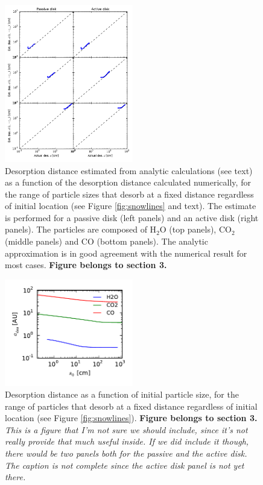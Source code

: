 \documentclass[apj]{emulateapj}
\newcommand{\emgr}[1]{\emph{ \color{gray} #1}}
\begin{document}
\begin{figure}[h!]
\centering
\includegraphics[width=0.5\textwidth]{../../figs/desorption_distance_actual_vs_estimated_passive_active.pdf}
\caption{Desorption distance estimated from analytic calculations (see text) as a function of the desorption distance calculated numerically, for the range of particle sizes that desorb at a fixed distance regardless of initial location (see Figure \ref{fig:snowlines} and text). The estimate is performed for a passive disk (left panels) and an active disk (right panels).  The particles are composed of H$_2$O (top panels), CO$_2$ (middle panels) and CO (bottom panels). The analytic approximation is in good agreement with the numerical result for most cases. \textbf{Figure belongs to section 3.}}  %
\label{fig:an_vs_actual}
\end{figure}

\begin{figure}[h!]
\centering
\includegraphics[width=0.5\textwidth]{../../figs/desorption_distance_vs_s.pdf}
\caption{Desorption distance as a function of initial particle size, for the range of particles that desorb at a fixed distance regardless of initial location (see Figure \ref{fig:snowlines}). \textbf{Figure belongs to section 3.} \emgr{This is a figure that I'm not sure we should include, since it's not really provide that much useful inside. If we did include it though, there would be two panels both for the passive and the active disk. The caption is not complete since the active disk panel is not yet there.}}  %
\label{fig:an_vs_actual}
\end{figure}
\end{document}

